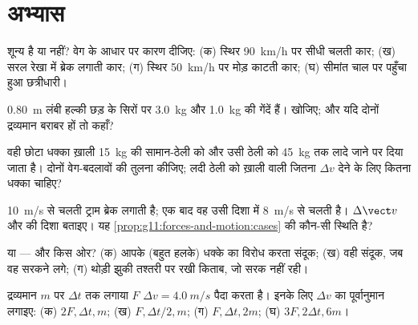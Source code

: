 \section{अभ्यास}

\begin{exercise}[$\star$]\label{exo:g11:forces-and-motion:1}
 शून्य है या नहीं? वेग के आधार पर कारण दीजिए: (क) स्थिर
\qty{90}{km/h} पर सीधी चलती कार; (ख) सरल रेखा में ब्रेक लगाती कार; (ग) स्थिर \qty{50}{km/h}
पर मोड़ काटती कार; (घ) सीमांत चाल पर पहुँचा हुआ छत्रीधारी।
\end{exercise}

\begin{exercise}[$\star$]\label{exo:g11:forces-and-motion:2}
\qty{0.80}{m} लंबी हल्की छड़ के सिरों पर \qty{3.0}{kg} और \qty{1.0}{kg} की गेंदें हैं।
 खोजिए; और यदि दोनों द्रव्यमान बराबर हों तो कहाँ?
\end{exercise}

\begin{exercise}[$\star$]\label{exo:g11:forces-and-motion:3}
वही छोटा धक्का ख़ाली \qty{15}{kg} की सामान-ठेली को और उसी ठेली को \qty{45}{kg} तक लादे
जाने पर दिया जाता है। दोनों वेग-बदलावों की तुलना कीजिए; लदी ठेली को ख़ाली
वाली जितना $\Delta v$ देने के लिए कितना धक्का चाहिए?
\end{exercise}

\begin{exercise}[$\star$]\label{exo:g11:forces-and-motion:4}
\qty{10}{m/s} से चलती ट्राम ब्रेक लगाती है; एक  बाद वह उसी दिशा में \qty{8}{m/s} से
चलती है। $\Delta \vect v$ और  की दिशा बताइए। यह \cref{prop:g11:forces-and-motion:cases} की कौन-सी
स्थिति है?
\end{exercise}

\begin{exercise}[$\star$]\label{exo:g11:forces-and-motion:5}
 या  --- और किस ओर? (क) आपके (बहुत हलके)
धक्के का विरोध करता संदूक; (ख) वही संदूक, जब वह सरकने लगे; (ग) थोड़ी झुकी
तश्तरी पर रखी किताब, जो सरक नहीं रही।
\end{exercise}

\begin{exercise}[$\star\star$]\label{exo:g11:forces-and-motion:6}
द्रव्यमान $m$ पर $\Delta t$ तक लगाया  $F$ $\Delta v = \qty{4.0}{m/s}$
पैदा करता है। इनके लिए $\Delta v$ का पूर्वानुमान लगाइए: (क) $2F, \Delta t, m$;
(ख) $F, \Delta t/2, m$; (ग) $F, \Delta t, 2m$; (घ) $3F, 2\Delta t, 6m$।
\end{exercise}

